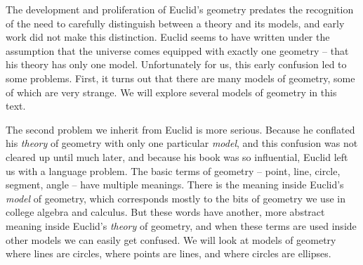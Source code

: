 The development and proliferation of Euclid's geometry predates the recognition of the need to carefully distinguish between a theory and its models, and early work did not make this distinction.
Euclid seems to have written under the assumption that the universe comes equipped with exactly one geometry -- that his theory has only one model.
Unfortunately for us, this early confusion led to some problems.
First, it turns out that there are many models of geometry, some of which are very strange.
We will explore several models of geometry in this text.

The second problem we inherit from Euclid is more serious.
Because he conflated his \emph{theory} of geometry with only one particular \emph{model}, and this confusion was not cleared up until much later, and because his book was so influential, Euclid left us with a language problem.
The basic terms of geometry -- point, line, circle, segment, angle -- have multiple meanings.
There is the meaning inside Euclid's \emph{model} of geometry, which corresponds mostly to the bits of geometry we use in college algebra and calculus.
But these words have another, more abstract meaning inside Euclid's \emph{theory} of geometry, and when these terms are used inside other models we can easily get confused.
We will look at models of geometry where lines are circles, where points are lines, and where circles are ellipses.
